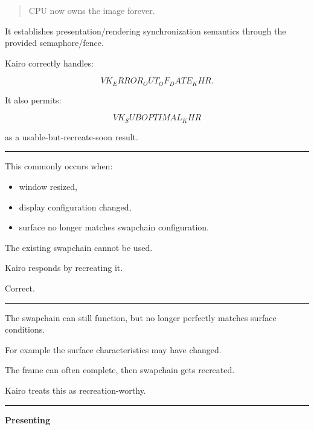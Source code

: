 \begin{quote}
CPU now owns the image forever.
\end{quote}

It establishes presentation/rendering synchronization semantics through the provided semaphore/fence.

Kairo correctly handles:

\[
VK_ERROR_OUT_OF_DATE_KHR.
\]

It also permits:

\[
VK_SUBOPTIMAL_KHR
\]

as a usable-but-recreate-soon result.

\begin{center}\rule{0.5\linewidth}{0.5pt}\end{center}

\textbf{}

This commonly occurs when:

\begin{itemize}
\tightlist
\item
  window resized,
\item
  display configuration changed,
\item
  surface no longer matches swapchain configuration.
\end{itemize}

The existing swapchain cannot be used.

Kairo responds by recreating it.

Correct.

\begin{center}\rule{0.5\linewidth}{0.5pt}\end{center}

\textbf{}

The swapchain can still function, but no longer perfectly matches surface conditions.

For example the surface characteristics may have changed.

The frame can often complete, then swapchain gets recreated.

Kairo treats this as recreation-worthy.

\begin{center}\rule{0.5\linewidth}{0.5pt}\end{center}

\textbf{Presenting}

